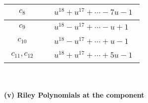 \documentclass[1p]{elsarticle_modified}
\theoremstyle{definition}
\begin{document}
\begin{tabular}{m{50pt}|m{274pt}}
\hline $$\begin{aligned}c_{8}\end{aligned}$$&$\begin{aligned}
&u^{18}+u^{17}+\cdots-7 u-1
\end{aligned}$\\
\hline $$\begin{aligned}c_{9}\end{aligned}$$&$\begin{aligned}
&u^{18}- u^{17}+\cdots- u+1
\end{aligned}$\\
\hline $$\begin{aligned}c_{10}\end{aligned}$$&$\begin{aligned}
&u^{18}- u^{17}+\cdots+u-1
\end{aligned}$\\
\hline $$\begin{aligned}c_{11},c_{12}\end{aligned}$$&$\begin{aligned}
&u^{18}+u^{17}+\cdots+5 u-1
\end{aligned}$\\
\hline
\end{tabular}\\~\\
\newpage\renewcommand{\arraystretch}{1}
\flushleft \textbf{(v) Riley Polynomials at the component}\newline \\
\end{document}
